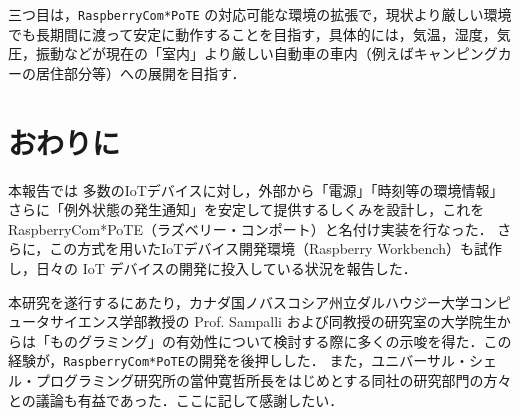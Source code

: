{三つ目は，{\tt Raspberry\-Com*PoTE} の対応可能な環境の拡張で，現状より厳しい環境でも長期間に渡って安定に動作することを目指す，具体的には，気温，湿度，気圧，振動などが現在の「室内」より厳しい自動車の車内（例えばキャンピングカーの居住部分等）への展開を目指す．




\section{おわりに}
\label{sec:07conclusion}

本報告では
多数のIoTデバイスに対し，外部から「電源」「時刻等の環境情報」さらに「例外状態の発生通知」を安定して提供するしくみを設計し，これを RaspberryCom*PoTE（ラズベリー・コンポート）と名付け実装を行なった．
さらに，この方式を用いたIoTデバイス開発環境（Raspberry Workbench）も試作し，日々の IoT デバイスの開発に投入している状況を報告した．





\begin{acknowledgment}

 本研究を遂行するにあたり，カナダ国ノバスコシア州立ダルハウジー大学コンピュータサイエンス学部教授の Prof. Sampalli および同教授の研究室の大学院生からは「ものグラミング」の有効性について検討する際に多くの示唆を得た．この経験が，{\tt Raspberry\-Com*PoTE}の開発を後押しした．
      また，ユニバーサル・シェル・プログラミング研究所の當仲寛哲所長をはじめとする同社の研究部門の方々との議論も有益であった．ここに記して感謝したい．


\end{acknowledgment}}
